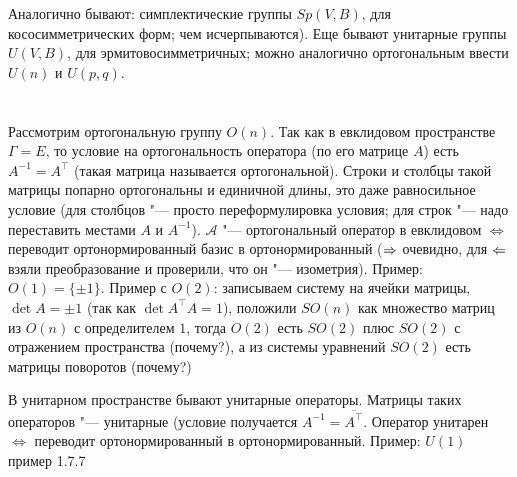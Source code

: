 Аналогично бывают: симплектические группы $Sp(V, B)$, для кососимметрических форм; \TODO чем исчерпываются).
Еще бывают унитарные группы $U(V, B)$, для эрмитовосимметричных; можно аналогично ортогональным ввести $U(n)$ и $U(p, q)$.

\section{} %
Рассмотрим ортогональную группу $O(n)$.
Так как в евклидовом пространстве $\Gamma=E$, то условие на ортогональность оператора (по его матрице $A$) есть $A^{-1}=A^\top$ (такая матрица называется ортогональной).
Строки и столбцы такой матрицы попарно ортогональны и единичной длины, это даже равносильное условие (для столбцов "--- просто переформулировка условия; для строк "--- надо переставить местами $A$ и $A^{-1}$).
$\mathcal{A}$ "--- ортогональный оператор в евклидовом $\iff$ переводит ортонормированный базис в ортонормированный ($\Rightarrow$ очевидно, для $\Leftarrow$ взяли преобразование и проверили, что он "--- изометрия).
Пример: $O(1)=\{ \pm 1 \}$.
Пример с $O(2)$: записываем систему на ячейки матрицы, $\det A = \pm 1$ (так как $\det A^\top A = 1$), положили $SO(n)$ как множество матриц из $O(n)$ с определителем $1$,
тогда $O(2)$ есть $SO(2)$ плюс $SO(2)$ с отражением пространства (\TODO почему?), а из системы уравнений $SO(2)$ есть матрицы поворотов (\TODO почему?)

В унитарном пространстве бывают унитарные операторы.
Матрицы таких операторов "--- унитарные (условие получается $A^{-1}=\overline{A^\top}$.
Оператор унитарен $\iff$ переводит ортонормированный в ортонормированный.
Пример: $U(1)$  \TODO пример 1.7.7
